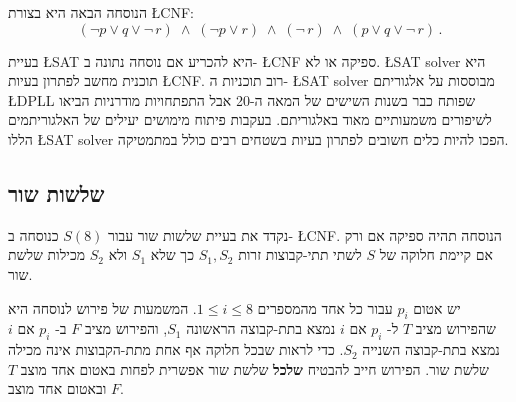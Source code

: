 הנוסחה הבאה היא בצורת
\L{CNF}:
\[
(\neg p \vee q \vee \neg \,r) \;\wedge\; (\neg p \vee r)
\;\wedge\; (\neg \,r)\;\wedge\;(p \vee q \vee \neg \,r)\,.
\]

בעיית
\L{SAT}
היא להכריע אם נוסחה נתונה ב-%
\L{CNF}
ספיקה או לא. 
\L{SAT solver}
היא תוכנית מחשב לפתרון בעיות
\L{CNF}.
רוב תוכניות ה-%
\L{SAT solver}
מבוססות על אלגוריתם
\L{DPLL}
שפותח כבר בשנות השישים של המאה ה-20 אבל התפתחויות מודרניות הביאו לשיפורים משמעותיים מאוד באלגוריתם. בעקבות פיתוח מימושים יעילים של האלגוריתמים הללו 
\L{SAT solver}
הפכו להיות כלים חשובים לפתרון בעיות בשטחים רבים כולל במתמטיקה.

\subsection{ שלשות שור }

נקדד את בעיית שלשות שור
עבור 
$S(8)$
כנוסחה ב-%
\L{CNF}.
הנוסחה תהיה ספיקה אם ורק אם קיימת חלוקה של 
$S$
לשתי תתי-קבוצות זרות
$S_1,S_2$
כך שלא 
$S_1$
ולא
$S_2$
מכילות שלשת שור.

יש אטום
$p_i$
עבור כל אחד מהמספרים
$1\leq i \leq 8$.
המשמעות של פירוש לנוסחה היא שהפירוש מציב
$T$
ל-%
$p_i$
אם
$i$
נמצא בתת-קבוצה הראשונה 
$S_1$,
והפירוש מציב 
$F$
ב-%
$p_i$
אם 
$i$
נמצא בתת-קבוצה השנייה
$S_2$.
כדי לראות שבכל חלוקה אף אחת מתת-הקבוצות אינה מכילה שלשת שור.
הפירוש חייב להבטיח 
\textbf{שלכל}
שלשת שור
אפשרית לפחות באטום אחד מוצב
$T$
ובאטום אחד מוצב
$F$. 

